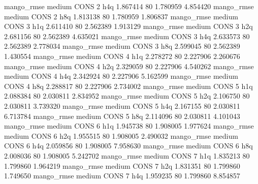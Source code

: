        mango_rmse     medium     CONS                 2                  h4q  1.867414 80       1.780959           4.854420
       mango_rmse     medium     CONS                 2                  h8q  1.813138 80       1.780959           1.806837
       mango_rmse     medium     CONS                 3                  h1q  2.611410 80       2.562389           1.913129
       mango_rmse     medium     CONS                 3                  h2q  2.681156 80       2.562389           4.635021
       mango_rmse     medium     CONS                 3                  h4q  2.633573 80       2.562389           2.778034
       mango_rmse     medium     CONS                 3                  h8q  2.599045 80       2.562389           1.430554
       mango_rmse     medium     CONS                 4                  h1q  2.278272 80       2.227906           2.260676
       mango_rmse     medium     CONS                 4                  h2q  2.329059 80       2.227906           4.540262
       mango_rmse     medium     CONS                 4                  h4q  2.342924 80       2.227906           5.162599
       mango_rmse     medium     CONS                 4                  h8q  2.288817 80       2.227906           2.734002
       mango_rmse     medium     CONS                 5                  h1q  2.088384 80       2.030811           2.834952
       mango_rmse     medium     CONS                 5                  h2q  2.106750 80       2.030811           3.739320
       mango_rmse     medium     CONS                 5                  h4q  2.167155 80       2.030811           6.713784
       mango_rmse     medium     CONS                 5                  h8q  2.114096 80       2.030811           4.101043
       mango_rmse     medium     CONS                 6                  h1q  1.945738 80       1.908005           1.977624
       mango_rmse     medium     CONS                 6                  h2q  1.955515 80       1.908005           2.490032
       mango_rmse     medium     CONS                 6                  h4q  2.059856 80       1.908005           7.958630
       mango_rmse     medium     CONS                 6                  h8q  2.008036 80       1.908005           5.242702
       mango_rmse     medium     CONS                 7                  h1q  1.835213 80       1.799860           1.964219
       mango_rmse     medium     CONS                 7                  h2q  1.831351 80       1.799860           1.749650
       mango_rmse     medium     CONS                 7                  h4q  1.959235 80       1.799860           8.854857
